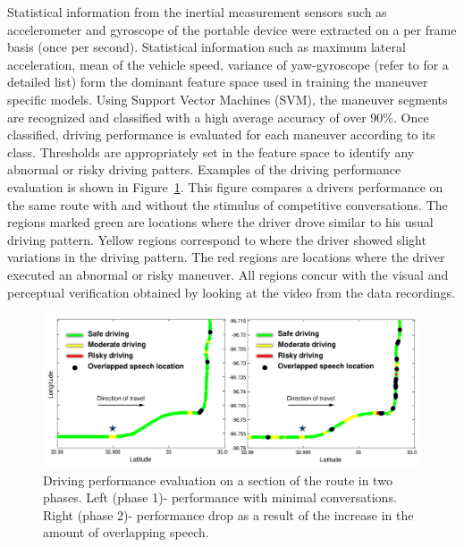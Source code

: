 Statistical information from the inertial measurement sensors such as accelerometer and gyroscope of the portable device were extracted on a per frame basis (once per second). 
Statistical information such as maximum lateral acceleration, mean of the vehicle speed, variance of yaw-gyroscope (refer to \cite{sathyanarayanaITSC2012} for a detailed list) form the dominant feature space used in training the maneuver specific models. 
Using Support Vector Machines (SVM), the maneuver segments are recognized and classified with a high average accuracy of over $90\%$. 
Once classified, driving performance is evaluated for each maneuver according to its class. 
Thresholds are appropriately set in the feature space to identify any abnormal or risky driving patters. 
Examples of the driving performance evaluation is shown in Figure~\ref{fig:driving_performance}. 
This figure compares a drivers performance on the same route with and without the stimulus of competitive conversations. 
The regions marked green are locations where the driver drove similar to his usual driving pattern. Yellow regions correspond to where the driver showed slight variations in the driving pattern. 
The red regions are locations where the driver executed an abnormal or risky maneuver. 
All regions concur with the visual and perceptual verification obtained by looking at the video from the data recordings. 

\begin{figure}[h!]
	\centering
	\includegraphics[scale=0.6]{figures/driving_and_overlap}
	\vspace{-5mm}
	\caption {Driving performance evaluation on a section of the route in two phases. Left (phase 1)-  performance with minimal conversations. Right (phase 2)- performance drop as a result of the increase in the amount of overlapping speech.}
	\label{fig:driving_performance}
	\vspace{-5mm}
\end{figure}


